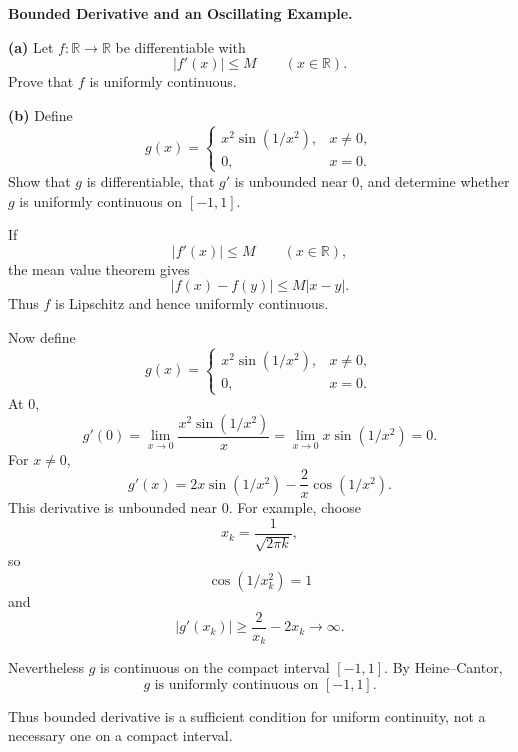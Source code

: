 \begin{problem}[CP-II-0433]
\label{prob:cp-ii-0433}
\textbf{Bounded Derivative and an Oscillating Example.}

\par\smallskip\hspace*{1.5em}\textbf{(a)}\quad
Let \(f:\mathbb R\to\mathbb R\) be differentiable with
\[
|f'(x)|\le M
\qquad(x\in\mathbb R).
\]
Prove that \(f\) is uniformly continuous.

\par\smallskip\noindent\textbf{(b)}\quad
Define
\[
g(x)=
\begin{cases}
x^2\sin(1/x^2),&x\ne0,\\
0,&x=0.
\end{cases}
\]
Show that \(g\) is differentiable, that \(g'\) is unbounded near \(0\), and
determine whether \(g\) is uniformly continuous on \([-1,1]\).
\end{problem}

\begin{solution}
If
\[
|f'(x)|\le M
\qquad(x\in\mathbb R),
\]
the mean value theorem gives
\[
|f(x)-f(y)|
\le
M|x-y|.
\]
Thus \(f\) is Lipschitz and hence uniformly continuous.

Now define
\[
g(x)=
\begin{cases}
x^2\sin(1/x^2),&x\neq0,\\
0,&x=0.
\end{cases}
\]
At \(0\),
\[
g'(0)
=
\lim_{x\to0}\frac{x^2\sin(1/x^2)}{x}
=
\lim_{x\to0}x\sin(1/x^2)
=
0.
\]
For \(x\neq0\),
\[
g'(x)
=
2x\sin(1/x^2)
-
\frac{2}{x}\cos(1/x^2).
\]
This derivative is unbounded near \(0\). For example, choose
\[
x_k=\frac1{\sqrt{2\pi k}},
\]
so
\[
\cos(1/x_k^2)=1
\]
and
\[
|g'(x_k)|
\ge
\frac2{x_k}-2x_k
\to\infty.
\]

Nevertheless \(g\) is continuous on the compact interval \([-1,1]\). By Heine--Cantor,
\[
\boxed{g\text{ is uniformly continuous on }[-1,1].}
\]

Thus bounded derivative is a sufficient condition for uniform continuity, not a necessary
one on a compact interval.
\end{solution}


